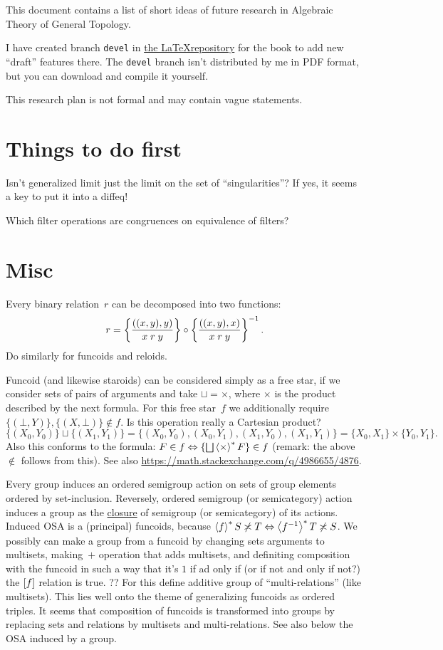 \documentclass{amsart}
\begin{document}
This document contains a list of short ideas of future research in Algebraic
Theory of General Topology.

I have created branch \texttt{devel} in \href{https://bitbucket.org/portonv/algebraic-general-topology}{the \LaTeX repository} for the book
to add new ``draft'' features there. The \texttt{devel} branch isn't distributed by me in PDF format, but you can download and compile it yourself.

This research plan is not formal and may contain vague statements.

\section{Things to do first}

Isn't generalized limit just the limit on the set of ``singularities''? If yes, it seems a key to put it into a diffeq!

Which filter operations are congruences on
equivalence of filters?

\section{Misc}

Every binary relation~$r$ can be decomposed into two functions:
\[r = \left\{ \frac{((x,y),y)}{x\mathrel{r}y}\right\}\circ\left\{ \frac{((x,y),x)}{x\mathrel{r}y}\right\}^{-1}.\]
Do similarly for funcoids and reloids.

Funcoid (and likewise staroids) can be considered simply as a free star, if we consider sets of pairs of arguments and take
${\sqcup}={\times}$, where $\times$ is the product described by the next formula. For this free star~$f$ we additionally
require $\{(\bot,Y)\},\{(X,\bot)\}\not\in f$. Is this operation really a Cartesian product?
$$\{(X_0,Y_0)\}\sqcup\{(X_1,Y_1)\} = \{(X_0,Y_0),(X_0,Y_1),(X_1,Y_0),(X_1,Y_1)\} = \{X_0,X_1\}\times\{Y_0,Y_1\}.$$
Also this conforms to the formula: $F\in f\Leftrightarrow\{\bigsqcup\rsupfun{\times}F\}\in f$
(remark: the above $\not\in$ follows from this).
See also \url{https://math.stackexchange.com/q/4986655/4876}.

Every group induces an ordered semigroup action on sets of group elements ordered by set-inclusion.
Reversely, ordered semigroup (or semicategory) action induces a group as the
\href{https://chatgpt.com/share/46122a34-caab-40b9-ba56-5fcba47d23c5}{closure} of semigroup (or semicategory) of its actions.
Induced OSA is a (principal) funcoids, because $\left\langle f\right\rangle ^{\ast}S\not\asymp T\Leftrightarrow \left\langle f^{-1}\right\rangle ^{\ast}T\not\asymp S$.
We possibly can make a group from a funcoid by changing sets arguments to multisets, making~$+$ operation that adds multisets,
and definiting composition with the funcoid in such a way that it's $1$ if ad only if (or if not and only if not?)
the $\mathrel{\left[f\right]}$ relation is true. ?? For this define additive group of ``multi-relations'' (like multisets).
This lies well onto the theme of generalizing funcoids as ordered triples. It seems that composition of funcoids is transformed
into groups by replacing sets and relations by multisets and multi-relations.
See also below the OSA induced by a group.
\end{document}
